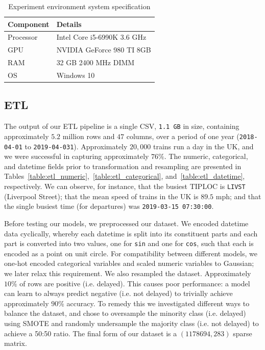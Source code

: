 \documentclass[12pt,a4paper]{article}
\begin{document}
\begin{table}[htb]
\centering
\caption{Experiment environment system specification}
\label{table:experiment}
\begin{tabular}{|l|l|}
\hline
{\bf Component} & {\bf Details}                     \\ \hline
Processor & Intel Core i5-6990K 3.6 GHz \\ \hline
GPU       & NVIDIA GeForce 980 TI 8GB   \\ \hline
RAM       & 32 GB 2400 MHz DIMM         \\ \hline
OS        & Windows 10                  \\ \hline
\end{tabular}
\end{table}

\subsection{ETL}

The output of our ETL pipeline is a single CSV, \verb|1.1 GB| in size, containing approximately $5.2$ million rows and $47$ columns, over a period of one year (\verb|2018-04-01| to \verb|2019-04-031|). Approximately $20,000$ trains run a day in the UK, and we were successful in capturing approximately $76\%$. The numeric, categorical, and datetime fields prior to transformation and resampling are presented in Tables~\ref{table:etl_numeric},~\ref{table:etl_categorical}, and~\ref{table:etl_datetime}, respectively. We can observe, for instance, that the busiest TIPLOC is \verb|LIVST| (Liverpool Street); that the mean speed of trains in the UK is $89.5$ mph; and that the single busiest time (for departures) was \verb|2019-03-15 07:30:00|.

Before testing our models, we preprocessed our dataset. We encoded datetime data cyclically, whereby each datetime is split into its constituent parts and each part is converted into two values, one for \verb|sin| and one for \verb|cos|, such that each is encoded as a point on unit circle. For compatibility between different models, we one-hot encoded categorical variables and scaled numeric variables to Gaussian; we later relax this requirement. We also resampled the dataset. Approximately $10\%$ of rows are positive (i.e. delayed). This causes poor performance: a model can learn to always predict negative (i.e. not delayed) to trivially achieve approximately $90$\% accuracy. To remedy this we investigated different ways to balance the dataset, and chose to oversample the minority class (i.e. delayed) using SMOTE \cite{chawla_et_al_2002} and randomly undersample the majority class (i.e. not delayed) to achieve a 50:50 ratio. The final form of our dataset is a $(1178694, 283)$ sparse matrix. 
\end{document}
